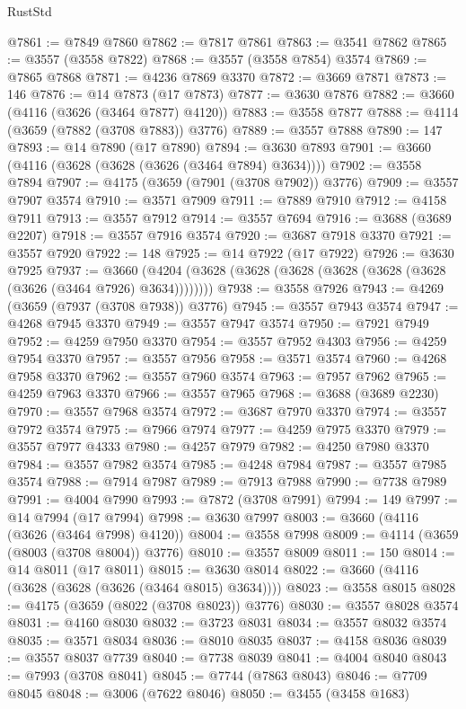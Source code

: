 \begin{lexlean}{RustStd}
\begin{coremodule}
@7861 := @7849 @7860
@7862 := @7817 @7861
@7863 := @3541 @7862
@7865 := @3557 (@3558 @7822)
@7868 := @3557 (@3558 @7854) @3574
@7869 := @7865 @7868
@7871 := @4236 @7869 @3370
@7872 := @3669 @7871
@7873 := 146
@7876 := @14 @7873 (@17 @7873)
@7877 := @3630 @7876
@7882 := @3660 (@4116 (@3626 (@3464 @7877) @4120))
@7883 := @3558 @7877
@7888 := @4114 (@3659 (@7882 (@3708 @7883)) @3776)
@7889 := @3557 @7888
@7890 := 147
@7893 := @14 @7890 (@17 @7890)
@7894 := @3630 @7893
@7901 := @3660 (@4116 (@3628 (@3628 (@3626 (@3464 @7894) @3634))))
@7902 := @3558 @7894
@7907 := @4175 (@3659 (@7901 (@3708 @7902)) @3776)
@7909 := @3557 @7907 @3574
@7910 := @3571 @7909
@7911 := @7889 @7910
@7912 := @4158 @7911
@7913 := @3557 @7912
@7914 := @3557 @7694
@7916 := @3688 (@3689 @2207)
@7918 := @3557 @7916 @3574
@7920 := @3687 @7918 @3370
@7921 := @3557 @7920
@7922 := 148
@7925 := @14 @7922 (@17 @7922)
@7926 := @3630 @7925
@7937 := @3660 (@4204 (@3628 (@3628 (@3628 (@3628 (@3628 (@3628 (@3626 (@3464 @7926) @3634))))))))
@7938 := @3558 @7926
@7943 := @4269 (@3659 (@7937 (@3708 @7938)) @3776)
@7945 := @3557 @7943 @3574
@7947 := @4268 @7945 @3370
@7949 := @3557 @7947 @3574
@7950 := @7921 @7949
@7952 := @4259 @7950 @3370
@7954 := @3557 @7952 @4303
@7956 := @4259 @7954 @3370
@7957 := @3557 @7956
@7958 := @3571 @3574
@7960 := @4268 @7958 @3370
@7962 := @3557 @7960 @3574
@7963 := @7957 @7962
@7965 := @4259 @7963 @3370
@7966 := @3557 @7965
@7968 := @3688 (@3689 @2230)
@7970 := @3557 @7968 @3574
@7972 := @3687 @7970 @3370
@7974 := @3557 @7972 @3574
@7975 := @7966 @7974
@7977 := @4259 @7975 @3370
@7979 := @3557 @7977 @4333
@7980 := @4257 @7979
@7982 := @4250 @7980 @3370
@7984 := @3557 @7982 @3574
@7985 := @4248 @7984
@7987 := @3557 @7985 @3574
@7988 := @7914 @7987
@7989 := @7913 @7988
@7990 := @7738 @7989
@7991 := @4004 @7990
@7993 := @7872 (@3708 @7991)
@7994 := 149
@7997 := @14 @7994 (@17 @7994)
@7998 := @3630 @7997
@8003 := @3660 (@4116 (@3626 (@3464 @7998) @4120))
@8004 := @3558 @7998
@8009 := @4114 (@3659 (@8003 (@3708 @8004)) @3776)
@8010 := @3557 @8009
@8011 := 150
@8014 := @14 @8011 (@17 @8011)
@8015 := @3630 @8014
@8022 := @3660 (@4116 (@3628 (@3628 (@3626 (@3464 @8015) @3634))))
@8023 := @3558 @8015
@8028 := @4175 (@3659 (@8022 (@3708 @8023)) @3776)
@8030 := @3557 @8028 @3574
@8031 := @4160 @8030
@8032 := @3723 @8031
@8034 := @3557 @8032 @3574
@8035 := @3571 @8034
@8036 := @8010 @8035
@8037 := @4158 @8036
@8039 := @3557 @8037 @7739
@8040 := @7738 @8039
@8041 := @4004 @8040
@8043 := @7993 (@3708 @8041)
@8045 := @7744 (@7863 @8043)
@8046 := @7709 @8045
@8048 := @3006 (@7622 @8046)
@8050 := @3455 (@3458 @1683)

\end{coremodule}
\end{lexlean}
